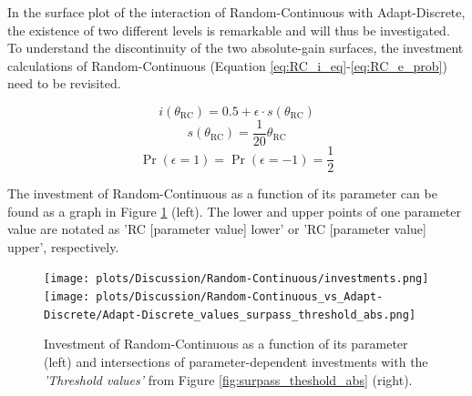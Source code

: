 \documentclass[11pt]{article}
\begin{document}
	\noindent
	In the surface plot of the interaction of Random-Continuous with Adapt-Discrete, the existence of two different levels is remarkable and will thus be investigated.
	To understand the discontinuity of the two absolute-gain surfaces, the investment calculations of Random-Continuous (Equation \ref{eq:RC_i_eq}-\ref{eq:RC_e_prob}) need to be revisited.

\begin{equation}
	i(\theta_{\mathrm{RC}}) = 0.5 + \epsilon \cdot s(\theta_{\mathrm{RC}})
	\label{eq:RC_i_eq_discuss}
\end{equation}
\begin{equation}
	s(\theta_{\mathrm{RC}}) = \frac{1}{20} {\theta_{\mathrm{RC}}}
	\label{eq:RC_s_eq_discuss}
\end{equation}
\begin{equation}
	\Pr(\epsilon = 1) = \Pr(\epsilon = -1) = \frac{1}{2}
	\label{eq:RC_e_prob_discuss}
\end{equation}

	\noindent
	The investment of Random-Continuous as a function of its parameter can be found as a graph in Figure \ref{fig:RC_investm} (left).
	The lower and upper points of one parameter value are notated as 'RC [parameter value] lower' or  'RC [parameter value] upper', respectively.

	\begin{figure}[h]
		\centering
		\texttt{[image: plots/Discussion/Random-Continuous/investments.png]}
		\texttt{[image: plots/Discussion/Random-Continuous\_vs\_Adapt-Discrete/Adapt-Discrete\_values\_surpass\_threshold\_abs.png]}
		\caption{Investment of Random-Continuous as a function of its parameter (left) and intersections of parameter-dependent investments with the \emph{'Threshold values'} from Figure \ref{fig:surpass_theshold_abs} (right).}
		\label{fig:RC_investm}
	\end{figure}
\end{document}
